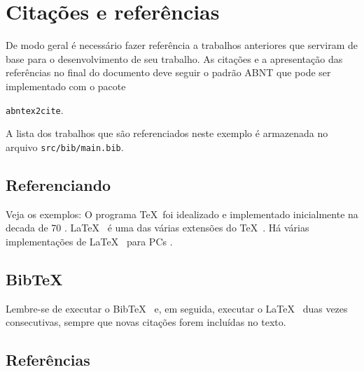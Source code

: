 
\chapter{Citações e referências}

De modo geral é necessário fazer referência a trabalhos anteriores
que serviram de base para o desenvolvimento de seu trabalho. As
citações e a apresentação das referências no final do
documento deve seguir o padrão ABNT que pode ser implementado com o pacote

\texttt{abntex2cite}.

\noindent A lista dos trabalhos que são referenciados neste
exemplo é armazenada no arquivo \newline\texttt{src/bib/main.bib}.

\section{Referenciando}

Veja os exemplos: O programa \TeX {}\ foi idealizado e implementado
inicialmente na decada de 70 \cite{knuth:tex}. \LaTeX {}\ \cite{lamport:latex}
é uma das várias extensões do \TeX \ \cite{knuth:tex}. Há
várias implementações de \LaTeX {}\ \cite{lamport:latex} para PCs
\cite{furuta:pctex}.

\section{BibTeX}

Lembre-se de executar o BibTeX\ \cite{patashnik:bibtex} e, em seguida, executar
o \LaTeX \ \cite{lamport:latex} duas vezes consecutivas, sempre que novas
citações forem incluídas no texto.

\section{Referências}
 \lipsum[1-3]